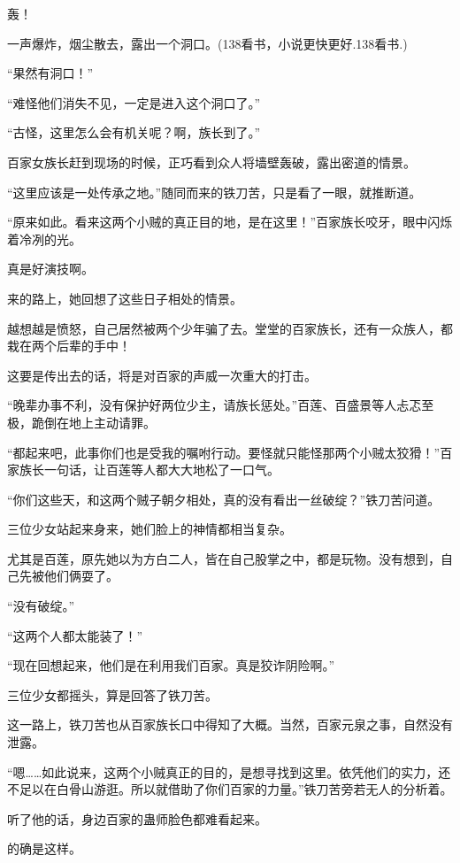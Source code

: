 
\begin{this_body}

轰！

一声爆炸，烟尘散去，露出一个洞口。(138看书，小说更快更好.138看书.)

“果然有洞口！”

“难怪他们消失不见，一定是进入这个洞口了。”

“古怪，这里怎么会有机关呢？啊，族长到了。”

百家女族长赶到现场的时候，正巧看到众人将墙壁轰破，露出密道的情景。

“这里应该是一处传承之地。”随同而来的铁刀苦，只是看了一眼，就推断道。

“原来如此。看来这两个小贼的真正目的地，是在这里！”百家族长咬牙，眼中闪烁着冷冽的光。

真是好演技啊。

来的路上，她回想了这些日子相处的情景。

越想越是愤怒，自己居然被两个少年骗了去。堂堂的百家族长，还有一众族人，都栽在两个后辈的手中！

这要是传出去的话，将是对百家的声威一次重大的打击。

“晚辈办事不利，没有保护好两位少主，请族长惩处。”百莲、百盛景等人忐忑至极，跪倒在地上主动请罪。

“都起来吧，此事你们也是受我的嘱咐行动。要怪就只能怪那两个小贼太狡猾！”百家族长一句话，让百莲等人都大大地松了一口气。

“你们这些天，和这两个贼子朝夕相处，真的没有看出一丝破绽？”铁刀苦问道。

三位少女站起来身来，她们脸上的神情都相当复杂。

尤其是百莲，原先她以为方白二人，皆在自己股掌之中，都是玩物。没有想到，自己先被他们俩耍了。

“没有破绽。”

“这两个人都太能装了！”

“现在回想起来，他们是在利用我们百家。真是狡诈阴险啊。”

三位少女都摇头，算是回答了铁刀苦。

这一路上，铁刀苦也从百家族长口中得知了大概。当然，百家元泉之事，自然没有泄露。

“嗯……如此说来，这两个小贼真正的目的，是想寻找到这里。依凭他们的实力，还不足以在白骨山游逛。所以就借助了你们百家的力量。”铁刀苦旁若无人的分析着。

听了他的话，身边百家的蛊师脸色都难看起来。

的确是这样。


\end{this_body}
